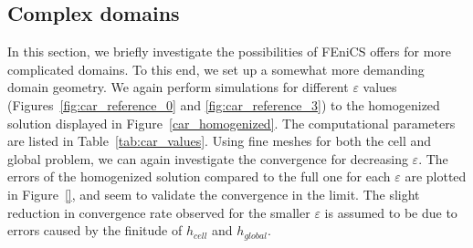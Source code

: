 \documentclass{article}
\renewcommand{\epsilon}{\varepsilon}
\begin{document}
  \subsection{Complex domains}\label{sec:car}
  In this section, we briefly investigate the possibilities of FEniCS offers for more complicated domains. To this end, we set up a somewhat more demanding domain geometry. We again perform simulations for different $\epsilon$ values (Figures~\ref{fig:car_reference_0} and \ref{fig:car_reference_3}) to the homogenized solution displayed in Figure~\ref{car_homogenized}. The computational parameters are listed in Table~\ref{tab:car_values}. Using fine meshes for both the cell and global problem, we can again investigate the convergence for decreasing $\epsilon$. The errors of the homogenized solution compared to the full one for each $\epsilon$ are plotted in Figure~\ref{}, and seem to validate the convergence in the limit. The slight reduction in convergence rate observed for the smaller $\epsilon$ is assumed to be due to errors caused by the finitude of $h_{cell}$ and $h_{global}$. 
  
\end{document}
